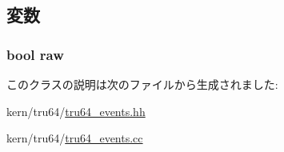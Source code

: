 \subsection{変数}
\hypertarget{classDebugPrintfEvent_a388d89b22cf20a999da0c692a3c3eb77}{
\subsubsection[{raw}]{\setlength{\rightskip}{0pt plus 5cm}bool {\bf raw}}}
\label{classDebugPrintfEvent_a388d89b22cf20a999da0c692a3c3eb77}


このクラスの説明は次のファイルから生成されました:\begin{DoxyCompactItemize}
\item 
kern/tru64/\hyperlink{tru64__events_8hh}{tru64\_\-events.hh}\item 
kern/tru64/\hyperlink{tru64__events_8cc}{tru64\_\-events.cc}\end{DoxyCompactItemize}
